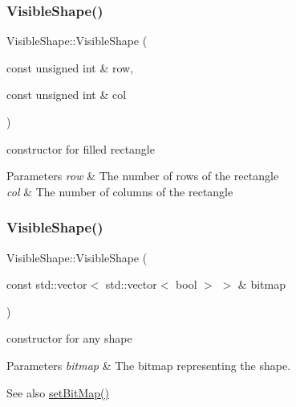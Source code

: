 \mbox{\label{class_visible_shape_adc9d11f72af8b96fdb379330fd9de592}} 
\subsubsection{\texorpdfstring{Visible\+Shape()}{VisibleShape()}\hspace{0.1cm}{\footnotesize\ttfamily [2/3]}}
{\footnotesize\ttfamily Visible\+Shape\+::\+Visible\+Shape (\begin{DoxyParamCaption}\item[{const unsigned int \&}]{row,  }\item[{const unsigned int \&}]{col }\end{DoxyParamCaption})}



constructor for filled rectangle 


\begin{DoxyParams}{Parameters}
{\em row} & The number of rows of the rectangle \\
\hline
{\em col} & The number of columns of the rectangle \\
\hline
\end{DoxyParams}
\mbox{\label{class_visible_shape_a0efa89e218acbaeaf4f2453467d54cc9}} 
\subsubsection{\texorpdfstring{Visible\+Shape()}{VisibleShape()}\hspace{0.1cm}{\footnotesize\ttfamily [3/3]}}
{\footnotesize\ttfamily Visible\+Shape\+::\+Visible\+Shape (\begin{DoxyParamCaption}\item[{const std\+::vector$<$ std\+::vector$<$ bool $>$ $>$ \&}]{bitmap }\end{DoxyParamCaption})}



constructor for any shape 


\begin{DoxyParams}{Parameters}
{\em bitmap} & The bitmap representing the shape. \\
\hline
\end{DoxyParams}
\begin{DoxySeeAlso}{See also}
\mbox{\hyperlink{class_shape_ae79ee483d0f48a426d1a544fd22fd8e5}{set\+Bit\+Map()}} 
\end{DoxySeeAlso}
\mbox{\label{class_visible_shape_a3cf57d96e1b85f8cda8bedefcc23ec45}} 
